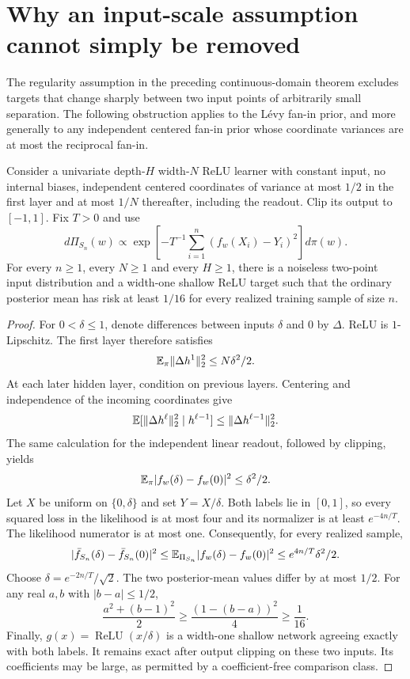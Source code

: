 \section{Why an input-scale assumption cannot simply be removed}
\label{sec:close-input-obstruction}
The regularity assumption in the preceding continuous-domain theorem
excludes targets that change sharply between two input points of
arbitrarily small separation. The following obstruction applies to
the L\'evy fan-in prior, and more generally to any independent centered
fan-in prior whose coordinate variances are at most the reciprocal
fan-in.

\begin{proposition}
\label{prop:close-input-obstruction}
Consider a univariate depth-$H$ width-$N$ ReLU learner with constant
input, no internal biases, independent centered coordinates of
variance at most $1/2$ in the first layer and at most $1/N$ thereafter,
including the readout. Clip its output to $[-1,1]$. Fix $T>0$ and use
\[
 d\Pi_{S_n}(w)\propto
 \exp\!\left[-T^{-1}\sum_{i=1}^n(f_w(X_i)-Y_i)^2\right]d\pi(w).
\]
For every $n\ge1$, every $N\ge1$ and every $H\ge1$, there is a
noiseless two-point input distribution and a width-one shallow ReLU
target such that the ordinary posterior mean has risk at least
$1/16$ for every realized training sample of size $n$.
\end{proposition}
\begin{proof}
For $0<\delta\le1$, denote differences between inputs $\delta$ and
$0$ by $\Delta$. ReLU is $1$-Lipschitz. The first layer therefore
satisfies
\[
 \mathbb E_\pi\|\Delta h^1\|_2^2\le N\delta^2/2.
\]
At each later hidden layer, condition on previous layers. Centering
and independence of the incoming coordinates give
\[
 \mathbb E[\|\Delta h^\ell\|_2^2\mid h^{\ell-1}]
 \le\|\Delta h^{\ell-1}\|_2^2.
\]
The same calculation for the independent linear readout, followed by
clipping, yields
\begin{equation}
 \mathbb E_\pi|f_w(\delta)-f_w(0)|^2\le\delta^2/2.
 \label{eq:prior-close-input}
\end{equation}
Let $X$ be uniform on $\{0,\delta\}$ and set $Y=X/\delta$.
Both labels lie in $[0,1]$, so every squared loss in the likelihood is
at most four and its normalizer is at least $e^{-4n/T}$.
The likelihood numerator is at most one. Consequently, for every
realized sample,
\[
 |\bar f_{S_n}(\delta)-\bar f_{S_n}(0)|^2
 \le\mathbb E_{\Pi_{S_n}}|f_w(\delta)-f_w(0)|^2
 \le e^{4n/T}\delta^2/2.
\]
Choose $\delta=e^{-2n/T}/\sqrt2$. The two posterior-mean values differ
by at most $1/2$. For any real $a,b$ with $|b-a|\le1/2$,
\[
 \frac{a^2+(b-1)^2}{2}
 \ge\frac{(1-(b-a))^2}{4}\ge\frac1{16}.
\]
Finally, $g(x)=\operatorname{ReLU}(x/\delta)$ is a width-one shallow
network agreeing exactly with both labels. It remains exact after
output clipping on these two inputs. Its coefficients may be large,
as permitted by a coefficient-free comparison class.
\end{proof}

